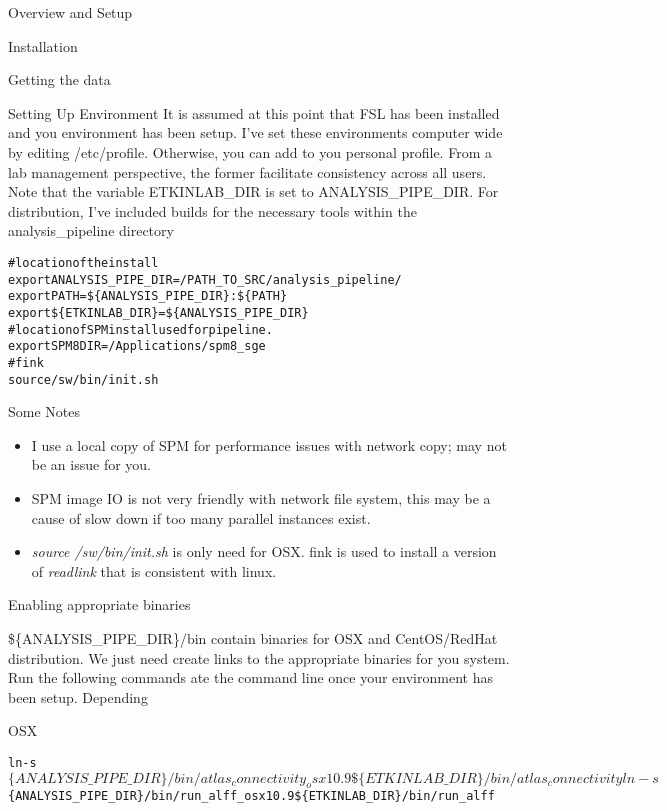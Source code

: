 \documentclass[]{report}
\begin{document}
\begin{chapter}{Overview and Setup}
\begin{section}{Installation}
\begin{subsection}{Getting the data}
\end{subsection}
\begin{subsection}{Setting Up Environment }
It is assumed at this point that FSL has been installed and you environment has been setup. I've set these environments computer wide by editing /etc/profile. Otherwise, you can add to you personal profile. From a lab management perspective, the former facilitate consistency across all users. Note that the variable ETKINLAB\_DIR is set to ANALYSIS\_PIPE\_DIR. For distribution, I've included builds for the necessary tools within the analysis\_pipeline directory
 
\begin{alltt}
#location of the install 
export ANALYSIS\_PIPE\_DIR=/PATH\_TO\_SRC/analysis\_pipeline/
export PATH=\$\{ANALYSIS_PIPE_DIR\}:\$\{PATH\}
export \$\{ETKINLAB\_DIR\}=\$\{ANALYSIS\_PIPE\_DIR\}
#location of SPM install used for pipeline. 
export SPM8DIR=/Applications/spm8\_sge
#fink
source /sw/bin/init.sh
\end{alltt}
{Some Notes}
\begin{itemize}
	\item  I use a local copy of SPM for performance issues with network copy; may not be an issue for you.
	\item  SPM image IO is not very friendly with network file system, this may be a cause of slow down if too many parallel instances exist.
	\item {\it source /sw/bin/init.sh} is only need for OSX. fink is used to install a version of {\it readlink} that is consistent with linux.  
\end{itemize}
\end{subsection}

\end{section}

\begin{section}{Enabling appropriate binaries}

\$\{ANALYSIS\_PIPE\_DIR\}/bin contain binaries for OSX and CentOS/RedHat distribution. We just need create links to the appropriate binaries for you system. 
Run the following commands ate the command line once your environment has been setup. Depending 
\begin{subsubsection}{OSX}
\begin{alltt}
	ln -s $\{ANALYSIS\_PIPE\_DIR\}/bin/atlas_connectivity_osx10.9 \$\{ETKINLAB\_DIR\}/bin/atlas_connectivity
	ln -s $\{ANALYSIS\_PIPE\_DIR\}/bin/run_alff_osx10.9 \$\{ETKINLAB\_DIR\}/bin/run_alff
\end{alltt}
\end{subsubsection}


\end{section}
\end{chapter}
\end{document}
